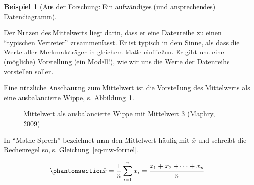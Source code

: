 \documentclass[
  a4paper,
]{scrbook}
\theoremstyle{definition}
\newtheorem{example}{Beispiel}[chapter]
\theoremstyle{definition}
\theoremstyle{definition}
\theoremstyle{remark}
\begin{document}
\begin{example}[Aus der Forschung: Ein aufwändiges (und ansprechendes)
Datendiagramm]
\begin{tcolorbox}[enhanced jigsaw, colbacktitle=quarto-callout-important-color!10!white, bottomrule=.15mm, left=2mm, breakable, rightrule=.15mm, coltitle=black, title=\textcolor{quarto-callout-important-color}{\faExclamation}\hspace{0.5em}{Wichtig}, colback=white, leftrule=.75mm, titlerule=0mm, opacityback=0, bottomtitle=1mm, toprule=.15mm, arc=.35mm, toptitle=1mm, opacitybacktitle=0.6, colframe=quarto-callout-important-color-frame]

Der Nutzen des Mittelwerts liegt darin, dass er eine Datenreihe zu einen
``typischen Vertreter'' zusammenfasst. Er ist typisch in dem Sinne, als
dass die Werte aller Merkmalsträger in gleichem Maße einfließen. Er gibt
uns eine (mögliche) Vorstellung (ein Modell!), wie wir uns die Werte der
Datenreihe vorstellen sollen.

\end{tcolorbox}

Eine nützliche Anschauung zum Mittelwert ist die Vorstellung des
Mittelwerts als eine ausbalancierte Wippe, s. Abbildung~\ref{fig-wippe}.

\begin{figure}


\caption{\label{fig-wippe}Mittelwert als ausbalancierte Wippe mit
Mittelwert 3 (Maphry, 2009)}

\end{figure}%

In ``Mathe-Sprech'' bezeichnet man den Mittelwert häufig mit \(\bar{x}\)
und schreibt die Rechenregel so, s. Gleichung~\ref{eq-mw-formel}.

\begin{equation}\phantomsection\label{eq-mw-formel}{\bar {x} =\frac{1}{n} \sum_{i=1}^{n}{x_{i}}=\frac {x_{1}+x_{2}+\dotsb +x_{n}} {n}}\end{equation}


\end{example}
\end{document}
